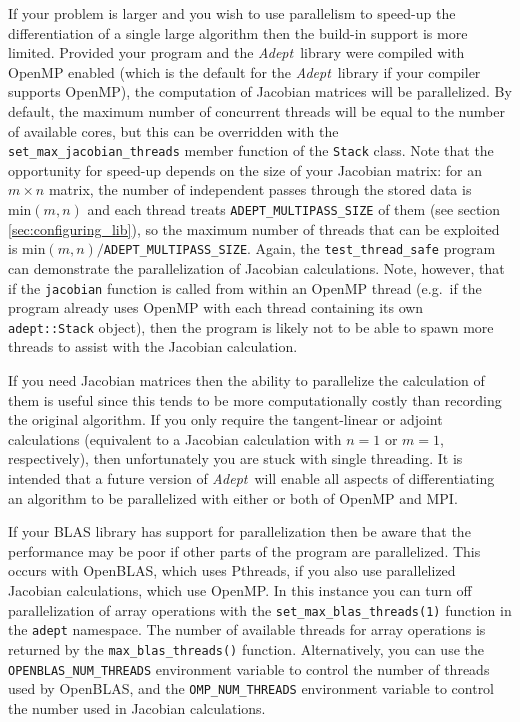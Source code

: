 \documentclass[a4,oneside]{book}
\def\codesize{\small}
\def\Adept{\emph{Adept}}
\def\code#1{{\codesize\texttt{#1}}}
\begin{document}
If your problem is larger and you wish to use parallelism to speed-up
the differentiation of a single large algorithm then the build-in
support is more limited. Provided your program and the \Adept\ library
were compiled with OpenMP enabled (which is the default for the
\Adept\ library if your compiler supports OpenMP), the computation of
Jacobian matrices will be parallelized.  By default, the maximum
number of concurrent threads will be equal to the number of available
cores, but this can be overridden with the
\code{set\_max\_jacobian\_threads} member function of the \code{Stack}
class.  Note that the opportunity for speed-up depends on the size of
your Jacobian matrix: for an $m\times n$ matrix, the number of
independent passes through the stored data is $\mathrm{min}(m,n)$ and
each thread treats \code{ADEPT\_MULTIPASS\_SIZE} of them (see section
\ref{sec:configuring_lib}), so the maximum number of threads that can
be exploited is $\mathrm{min}(m,n)/$\code{ADEPT\_MULTIPASS\_SIZE}.
Again, the \code{test\_thread\_safe} program can demonstrate the
parallelization of Jacobian calculations.  Note, however, that if the
\code{jacobian} function is called from within an OpenMP thread
(e.g.\ if the program already uses OpenMP with each thread containing
its own \code{adept::Stack} object), then the program is likely not to
be able to spawn more threads to assist with the Jacobian calculation.

If you need Jacobian matrices then the ability to parallelize the
calculation of them is useful since this tends to be more
computationally costly than recording the original algorithm.  If you
only require the tangent-linear or adjoint calculations (equivalent to
a Jacobian calculation with $n=1$ or $m=1$, respectively), then
unfortunately you are stuck with single threading. It is intended that
a future version of \Adept\ will enable all aspects of differentiating
an algorithm to be parallelized with either or both of OpenMP and MPI.

If your BLAS library has support for parallelization then be aware
that the performance may be poor if other parts of the program are
parallelized.  This occurs with OpenBLAS, which uses Pthreads, if you
also use parallelized Jacobian calculations, which use OpenMP.  In
this instance you can turn off parallelization of array operations
with the \code{set\_max\_blas\_threads(1)} function in the
\code{adept} namespace.  The number of available threads for array
operations is returned by the \code{max\_blas\_threads()} function.
Alternatively, you can use the \code{OPENBLAS\_NUM\_THREADS}
environment variable to control the number of threads used by
OpenBLAS, and the \code{OMP\_NUM\_THREADS} environment variable to
control the number used in Jacobian calculations.
\end{document}
